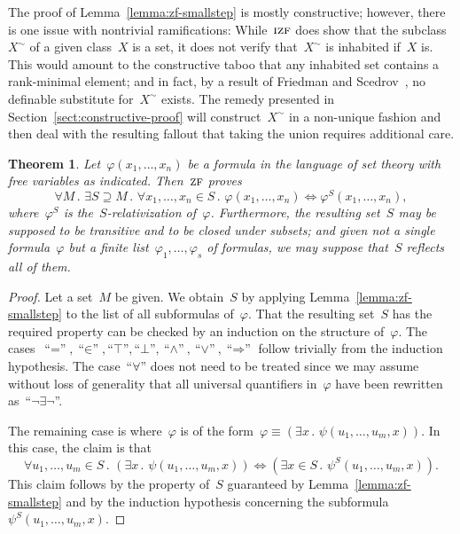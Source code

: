 \documentclass[oneside,reqno]{amsart}
\theoremstyle{definition}
\theoremstyle{plain}
\newtheorem{thm}[defn]{Theorem}
\theoremstyle{remark}
\renewcommand{\_}{\mathpunct{.}\,}
\newcommand{\?}{\,{:}\,}
\newcommand{\ZF}{\textsc{zf}}
\newcommand{\IZF}{\textsc{izf}}
\begin{document}
The proof of Lemma~\ref{lemma:zf-smallstep} is mostly constructive; however,
there is one issue with nontrivial ramifications: While~$\IZF$ does show
that the subclass~$X^\sim$ of a given class~$X$ is a set, it does not verify
that~$X^\sim$ is inhabited if~$X$ is. This would amount to the constructive
taboo that any inhabited set contains a rank-minimal element; and in fact, by
a result of Friedman and Scedrov~\cite{XXX}, no definable substitute
for~$X^\sim$ exists. The remedy presented in
Section~\ref{sect:constructive-proof} will construct~$X^\sim$ in a non-unique
fashion and then deal with the resulting fallout that taking the union requires
additional care.

\begin{thm}\label{thm:zf-bigstep}
Let~$\varphi(x_1,\ldots,x_n)$ be a formula in the language of set
theory with free variables as indicated. Then~$\ZF$ proves
\[ \forall M\_
  \exists S \supseteq M\_
  \forall x_1,\ldots,x_n \in S\_
  \varphi(x_1,\ldots,x_n) \Leftrightarrow \varphi^S(x_1,\ldots,x_n), \]
where~$\varphi^S$ is the~$S$-relativization of~$\varphi$. Furthermore, the
resulting set~$S$ may be supposed to be transitive and to be closed under
subsets; and given not a single formula~$\varphi$ but a finite
list~$\varphi_1,\ldots,\varphi_s$ of formulas, we may suppose that~$S$ reflects
all of them.
\end{thm}

\begin{proof}Let a set~$M$ be given. We obtain~$S$ by applying
Lemma~\ref{lemma:zf-smallstep} to the list of all subformulas of~$\varphi$. That
the resulting set~$S$ has the required property can be checked by an induction on the structure
of~$\varphi$. The cases~$\text{``$=$''}, \text{``$\in$''}, \text{``$\top$''},
\text{``$\bot$''}, \text{``$\wedge$''},
\text{``$\vee$''}, \text{``$\Rightarrow$''}$ follow
trivially from the induction hypothesis. The case~``$\forall$'' does
not need to be treated since we may assume without loss of generality that all
universal quantifiers in~$\varphi$ have been rewritten
as~``$\neg\exists\neg$''.

The remaining case is where~$\varphi$ is of the form~$\varphi \equiv (\exists
x\_ \psi(u_1,\ldots,u_m,x))$. In this case, the claim is that
\[ \forall u_1,\ldots,u_m \in S\_
  (\exists x\_ \psi(u_1,\ldots,u_m,x)) \Longleftrightarrow
  (\exists x \in S\_ \psi^S(u_1,\ldots,u_m,x)). \]
This claim follows by the property of~$S$ guaranteed by
Lemma~\ref{lemma:zf-smallstep} and by the induction hypothesis concerning the
subformula~$\psi^S(u_1,\ldots,u_m,x)$.
\end{proof}
\end{document}
